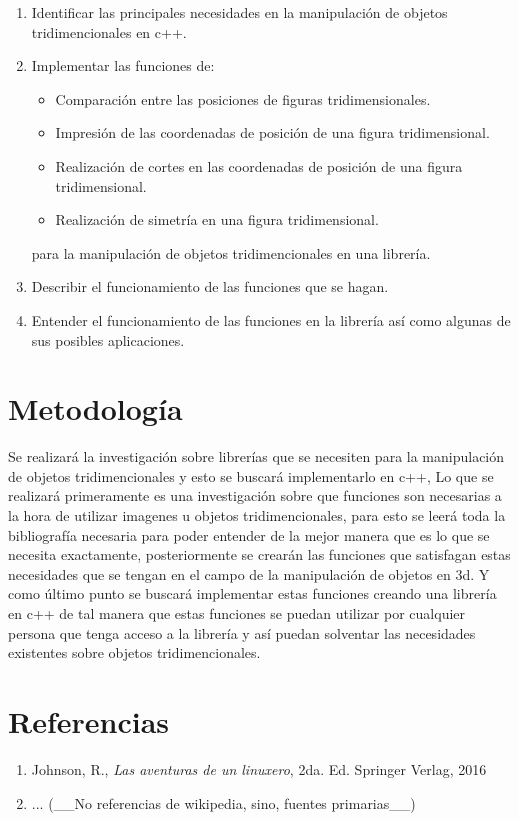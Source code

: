 \documentclass[letterpaper]{article}
\begin{document}
\begin{enumerate}
\item Identificar las principales necesidades en la manipulación de objetos tridimencionales en c++.
\item Implementar las funciones de:\begin{itemize}
\item Comparación entre las posiciones de figuras tridimensionales.
\item Impresión de las coordenadas de posición de una figura tridimensional.
\item Realización de cortes en las coordenadas de posición de una figura tridimensional.
\item Realización de simetría en una figura tridimensional.
\end{itemize}
para la manipulaci\'on de objetos tridimencionales en una librer\'ia.

\item Describir el funcionamiento de las funciones que se hagan.
\item Entender el funcionamiento de las funciones en la librer\'ia as\'i como algunas de sus posibles aplicaciones.
\end{enumerate}

\section{Metodología}

Se realizará la investigación sobre librerías que se necesiten para la manipulación de objetos tridimencionales y esto se buscará implementarlo en c++, Lo que se realizará primeramente es una investigación sobre que funciones son necesarias a la hora de utilizar imagenes u objetos tridimencionales, para esto se leerá toda la bibliografía necesaria para poder entender de la mejor manera que es lo que se necesita exactamente, posteriormente se crearán las funciones que satisfagan estas necesidades que se tengan en el campo de la manipulación de objetos en 3d. Y como último punto se buscará implementar estas funciones creando una librería en c++ de tal manera que estas funciones se puedan utilizar por cualquier persona que tenga acceso a la librería y así puedan solventar las necesidades existentes sobre objetos tridimencionales.\\



\section{Referencias}

\begin{enumerate}
\item Johnson, R., \textit{Las aventuras de un linuxero}, 2da. Ed. Springer Verlag, 2016
\item ... (\_\_No referencias de wikipedia, sino, fuentes primarias\_\_)
\end{enumerate}
	
\end{document}
